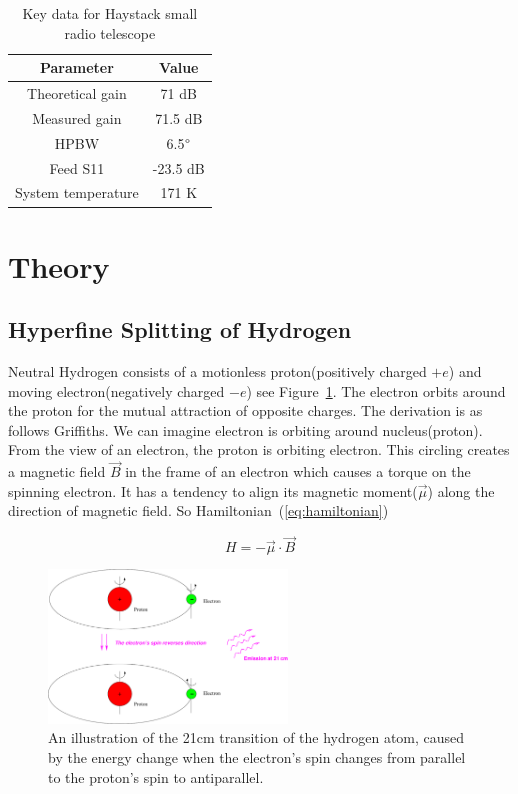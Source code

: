 \documentclass[conference]{IEEEtran}
\begin{document}
\begin{table}[htbp]
\caption{Key data for Haystack small radio telescope}
\begin{center}
\begin{tabular}{|c|c|}
\hline
\textbf{Parameter}&\multicolumn{1}{|c|}{\textbf{Value}} \\
\cline{1-2} 
\hline
Theoretical gain & 71 dB\\
\hline
Measured gain & 71.5 dB\\
\hline
HPBW & 6.5$\degree$\\
\hline
Feed S11 & -23.5 dB\\
\hline
System temperature & 171 K\\
\hline
\end{tabular}
\label{Tab:block_summerize}
\end{center}
\end{table}

\section{Theory}

\subsection{Hyperfine Splitting of Hydrogen}

Neutral Hydrogen consists of a motionless proton(positively charged $+e$) and moving electron(negatively charged $-e$) see Figure~\ref{fig:hyperfine_figure}. The electron orbits around the proton for the mutual attraction of opposite charges. The derivation is as follows Griffiths\cite{griffiths2016introduction}. We can imagine electron is orbiting around nucleus(proton). From the view of an electron, the proton is orbiting electron. This circling creates a magnetic field $\vec{B}$ in the frame of an electron which causes a torque on the spinning electron. It has a tendency to align its magnetic moment($\vec{\mu}$) along the direction of magnetic field\cite{griffiths2016introduction}. So Hamiltonian~(\ref{eq:hamiltonian})

\begin{equation}
  H=-\vec{\mu}\cdot\vec{B}
  \label{eq:hamiltonian} 
\end{equation}

\begin{figure}[htbp]
\centerline{\includegraphics[width=2.5in]{hyperfine.pdf}}
\caption{An illustration of the 21cm transition of the hydrogen atom, caused by the energy change when the electron's spin changes from parallel to the proton's spin to antiparallel\cite{Dante2014}.}
\label{fig:hyperfine_figure}
\end{figure}
\end{document}
